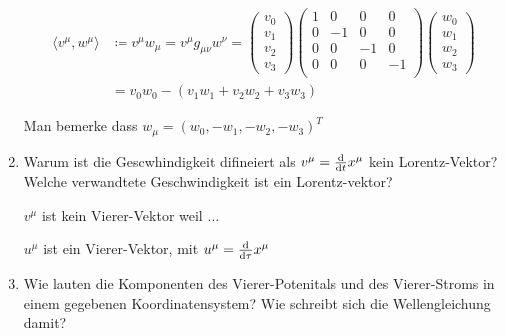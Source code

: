 \begin{enumerate}
      \begin{equation*}
        \begin{split}
        \langle v^\mu , w^\mu \rangle 
        &\coloneqq v^\mu w_\mu = 
        v^\mu g_{\mu\nu} w^\nu
        =
        \begin{pmatrix}
          v_0 \\ v_1 \\ v_2 \\ v_3
        \end{pmatrix}
        \begin{pmatrix}
          1 & 0  & 0  &  0\\
          0 & -1 & 0  &  0\\
          0 & 0  & -1 &  0\\
          0 & 0  & 0  & -1\\
        \end{pmatrix}
        \begin{pmatrix}
          w_0 \\ w_1 \\ w_2 \\ w_3
        \end{pmatrix}\\
        &=v_0w_0 - (v_1w_1 + v_2w_2 + v_3w_3)
        \end{split}
      \end{equation*}

      Man bemerke dass $w_\mu=(w_0, -w_1, -w_2, -w_3)^T$

    \item Warum ist die Gescwhindigkeit difineiert als $v^\mu=\dv t x^\mu$
      kein Lorentz-Vektor? Welche verwandtete Geschwindigkeit ist ein
      Lorentz-vektor?

      $v^\mu$ ist kein Vierer-Vektor weil $\ldots$

      $u^\mu$ ist ein Vierer-Vektor, mit $u^\mu=\dv \tau x^\mu$

    \item Wie lauten die Komponenten des Vierer-Potenitals und des
      Vierer-Stroms in einem gegebenen Koordinatensystem? Wie schreibt
      sich die Wellengleichung damit?


\end{enumerate}
